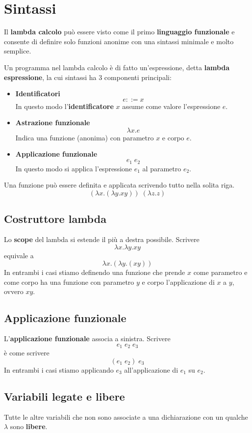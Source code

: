 \section{Sintassi}
Il \textbf{lambda calcolo} può essere visto come il primo \textbf{linguaggio funzionale} e consente di definire
solo funzioni anonime con una sintassi minimale e molto semplice.

Un programma nel lambda calcolo è di fatto un'espressione, detta \textbf{lambda espressione}, la cui sintassi ha
3 componenti principali:
\begin{itemize}
	\item \textbf{Identificatori}
	      \[ e ::= x \]
	      In questo modo l'\textbf{identificatore} $x$ assume come valore l'espressione $e$.
	\item \textbf{Astrazione funzionale}
	      \[ \lambda x.e \]
	      Indica una funzione (anonima) con parametro $x$ e corpo $e$.
	\item \textbf{Applicazione funzionale}
	      \[ e_1 \; e_2 \]
	      In questo modo si applica l'espressione $e_1$ al parametro $e_2$.
\end{itemize}
Una funzione può essere definita e applicata scrivendo tutto nella solita riga.
\[ (\lambda x.(\lambda y.xy)) \; (\lambda z.z) \]

\subsection{Costruttore lambda}
Lo \textbf{scope} del lambda si estende il più a destra possibile. Scrivere
\[ \lambda x. \lambda y. x y \]
equivale a
\[ \lambda x. (\lambda y. (x y)) \]
In entrambi i casi stiamo definendo una funzione che prende $x$ come parametro e come corpo ha una funzione con
parametro $y$ e corpo l'applicazione di $x$ a $y$, ovvero $xy$.

\subsection{Applicazione funzionale}
L'\textbf{applicazione funzionale} associa a sinistra. Scrivere
\[ e_1 \; e_2 \; e_3 \]
è come scrivere
\[ (e_1 \; e_2) \; e_3 \]
In entrambi i casi stiamo applicando $e_3$ all'applicazione di $e_1$ su $e_2$.

\subsection{Variabili legate e libere}
Tutte le altre variabili che non sono associate a una dichiarazione con un qualche $\lambda$ sono \textbf{libere}.

